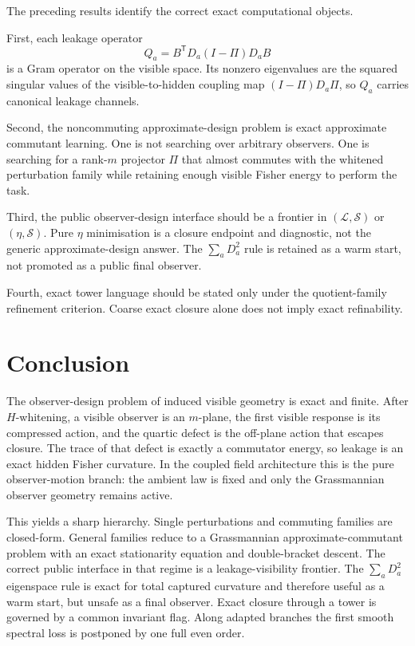 \documentclass[11pt,a4paper]{article}
\numberwithin{equation}{section}
\theoremstyle{thmcompact}
\theoremstyle{remark}
\begin{document}
The preceding results identify the correct exact computational objects.

First, each leakage operator
\begin{equation}
Q_a=B^{\mathsf T}D_a(I-\Pi)D_aB
\label{eq:Qa-op}
\end{equation}
is a Gram operator on the visible space. Its nonzero eigenvalues are the squared singular values of the visible-to-hidden coupling map $(I-\Pi)D_a\Pi$, so $Q_a$ carries canonical leakage channels.

Second, the noncommuting approximate-design problem is exact approximate commutant learning. One is not searching over arbitrary observers. One is searching for a rank-$m$ projector $\Pi$ that almost commutes with the whitened perturbation family while retaining enough visible Fisher energy to perform the task.

Third, the public observer-design interface should be a frontier in $(\mathcal L,\mathcal S)$ or $(\eta,\mathcal S)$. Pure $\eta$ minimisation is a closure endpoint and diagnostic, not the generic approximate-design answer. The $\sum_a D_a^2$ rule is retained as a warm start, not promoted as a public final observer.

Fourth, exact tower language should be stated only under the quotient-family refinement criterion. Coarse exact closure alone does not imply exact refinability.

\section{Conclusion}

The observer-design problem of induced visible geometry is exact and finite. After $H$-whitening, a visible observer is an $m$-plane, the first visible response is its compressed action, and the quartic defect is the off-plane action that escapes closure. The trace of that defect is exactly a commutator energy, so leakage is an exact hidden Fisher curvature. In the coupled field architecture this is the pure observer-motion branch: the ambient law is fixed and only the Grassmannian observer geometry remains active.

This yields a sharp hierarchy. Single perturbations and commuting families are closed-form. General families reduce to a Grassmannian approximate-commutant problem with an exact stationarity equation and double-bracket descent. The correct public interface in that regime is a leakage-visibility frontier. The $\sum_a D_a^2$ eigenspace rule is exact for total captured curvature and therefore useful as a warm start, but unsafe as a final observer. Exact closure through a tower is governed by a common invariant flag. Along adapted branches the first smooth spectral loss is postponed by one full even order.
\end{document}
